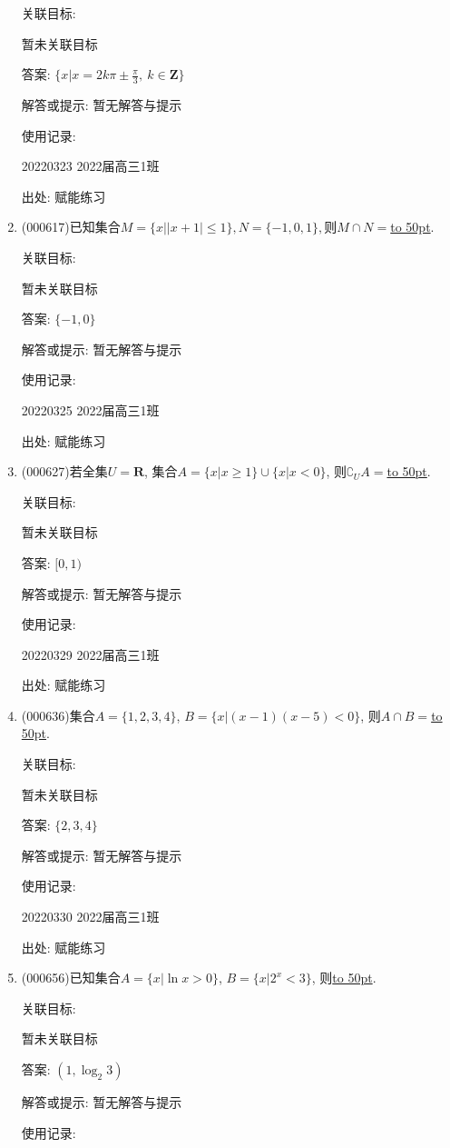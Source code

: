 \documentclass[10pt,a4paper]{article}
\newcommand{\blank}[1]{\underline{\hbox to #1pt{}}}
\begin{document}
\begin{enumerate}[1.]
关联目标:

暂未关联目标

答案: $\{ x|x=2k\pi \pm \frac{\pi }3,\ k\in \mathbf{Z}\}$

解答或提示: 暂无解答与提示

使用记录:

20220323	2022届高三1班	


出处: 赋能练习
\item { (000617)}已知集合$M=\{x||x+1|\le 1\},N=\{-1,0,1\},$则$M\cap N=$\blank{50}.


关联目标:

暂未关联目标

答案: $\{-1,0\}$

解答或提示: 暂无解答与提示

使用记录:

20220325	2022届高三1班	


出处: 赋能练习
\item { (000627)}若全集$U=\mathbf{R}$, 集合$A=\{x|x\ge 1\}\cup\{x|x<0\}$, 则$\complement_U A=$\blank{50}.


关联目标:

暂未关联目标

答案: $[0,1)$

解答或提示: 暂无解答与提示

使用记录:

20220329	2022届高三1班	


出处: 赋能练习
\item { (000636)}集合$A=\{1,2,3,4\}$, $B=\{x|(x-1)(x-5)<0\}$, 则$A\cap B=$\blank{50}.


关联目标:

暂未关联目标

答案: $\{2,3,4\}$

解答或提示: 暂无解答与提示

使用记录:

20220330	2022届高三1班	


出处: 赋能练习
\item { (000656)}已知集合$A=\{x|\ln x>0 \}$, $B=\{x|2^x<3\}$, 则\blank{50}.


关联目标:

暂未关联目标

答案: $(1,\log_2 3)$

解答或提示: 暂无解答与提示

使用记录:


\end{enumerate}
\end{document}
